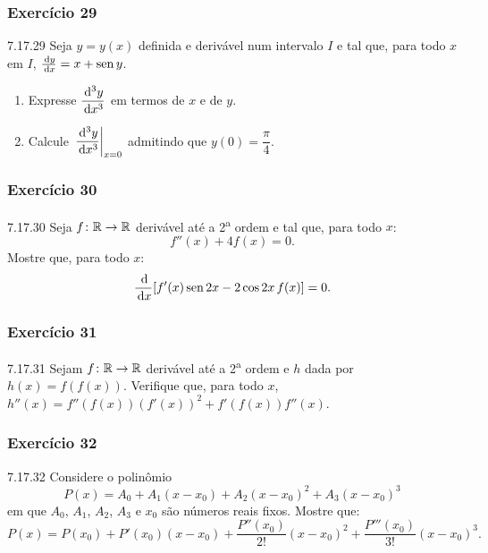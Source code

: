 \subsubsection*{Exercício 29}
\begin{exercicio}[29]{7.17.29}
Seja $y = y(x)$ definida e derivável num intervalo $I$ e tal que, para todo $x$ em $I$, $\frac{\,\mathrm{d} y}{\,\mathrm{d} x} = x + \operatorname{sen} y$.
\begin{enumerate}[label=\alph*)]
    \item Expresse $\dfrac{\,\mathrm{d}^3 y}{\,\mathrm{d} x^3}$ em termos de $x$ e de $y$.
    \item Calcule $\left.\dfrac{\,\mathrm{d}^3 y}{\,\mathrm{d} x^3}\right|_{x = 0}$ admitindo que $y(0) = \dfrac{\pi}{4}$.
\end{enumerate}
\end{exercicio}

\subsubsection*{Exercício 30}
\begin{exercicio}[30]{7.17.30}
Seja $f\colon \mathbb{R} \to \mathbb{R}$ derivável até a 2\textsuperscript{a} ordem e tal que, para todo $x$:
\[
f''(x) + 4f(x) = 0.
\]
Mostre que, para todo $x$:
\[
\frac{\,\mathrm{d}}{\,\mathrm{d} x}[f'(x)\operatorname{sen} 2x - 2\cos 2x\,f(x)] = 0.
\]
\end{exercicio}

\subsubsection*{Exercício 31}
\begin{exercicio}[31]{7.17.31}
Sejam $f\colon \mathbb{R} \to \mathbb{R}$ derivável até a 2\textsuperscript{a} ordem e $h$ dada por $h(x) = f(f(x))$. Verifique que, para todo $x$, $h''(x) = f''(f(x))(f'(x))^2 + f'(f(x))f''(x)$.
\end{exercicio}

\subsubsection*{Exercício 32}
\begin{exercicio}[32]{7.17.32}
Considere o polinômio
\[
P(x) = A_0 + A_1 (x - x_0) + A_2 (x - x_0)^2 + A_3 (x - x_0)^3
\]
em que $A_0$, $A_1$, $A_2$, $A_3$ e $x_0$ são números reais fixos. Mostre que:
\[
P(x) = P(x_0) + P'(x_0)(x - x_0) + \dfrac{P''(x_0)}{2!}(x - x_0)^2 + \dfrac{P'''(x_0)}{3!}(x - x_0)^3.
\]
\end{exercicio}

